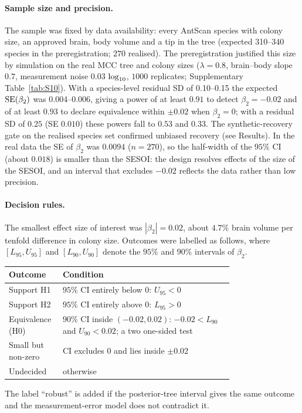 \documentclass[11pt]{article}
\begin{document}
\paragraph{Sample size and precision.} The sample was fixed by data availability: every AntScan species with colony
size, an approved brain, body volume and a tip in the tree (expected 310--340 species in the preregistration; $270$
realised). The preregistration justified this size by simulation on the real MCC tree and colony sizes
($\lambda = 0.8$, brain--body slope $0.7$, measurement noise $0.03$ $\log_{10}$, $1000$ replicates; Supplementary
Table~\ref{tab:S10}). With a species-level residual SD of 0.10--0.15 the expected $\mathrm{SE}(\beta_2)$ was 0.004--0.006,
giving a power of at least $0.91$ to detect $\beta_2 = -0.02$ and of at least $0.93$ to declare equivalence within
$\pm 0.02$ when $\beta_2 = 0$; with a residual SD of $0.25$ (SE $0.010$) these powers fall to $0.53$ and $0.33$. The
synthetic-recovery gate on the realised species set confirmed unbiased recovery (see Results). In the real data the
SE of $\beta_2$ was $0.0094$ ($n = 270$), so the half-width of the $95\%$ CI (about $0.018$) is smaller than the
SESOI: the design resolves effects of the size of the SESOI, and an interval that excludes $-0.02$ reflects the data
rather than low precision.

\paragraph{Decision rules.} The smallest effect size of interest was $|\beta_2| = 0.02$, about $4.7\%$ brain volume
per tenfold difference in colony size. Outcomes were labelled as follows, where $[L_{95}, U_{95}]$ and
$[L_{90}, U_{90}]$ denote the $95\%$ and $90\%$ intervals of $\beta_2$.
\begin{center}
\small
\begin{tabular}{@{}l>{\raggedright\arraybackslash}p{0.76\linewidth}@{}}
\toprule
Outcome & Condition \\
\midrule
Support H1 & $95\%$ CI entirely below $0$: $U_{95} < 0$ \\
Support H2 & $95\%$ CI entirely above $0$: $L_{95} > 0$ \\
Equivalence (H0) & $90\%$ CI inside $(-0.02, 0.02)$: $-0.02 < L_{90}$ and $U_{90} < 0.02$; a two one-sided
  test~\citep{lakens2017} \\
Small but non-zero & CI excludes $0$ and lies inside $\pm 0.02$ \\
Undecided & otherwise \\
\bottomrule
\end{tabular}
\end{center}
The label ``robust'' is added if the posterior-tree interval gives the same outcome and the measurement-error model
does not contradict it.
\end{document}
